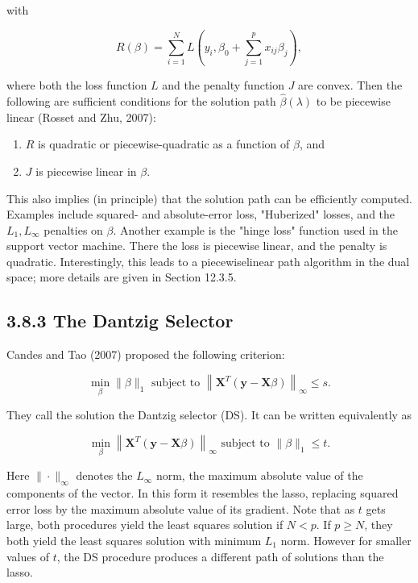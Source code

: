 \documentclass[10pt]{article}
\begin{document}
with


\begin{equation*}
R(\beta)=\sum_{i=1}^{N} L\left(y_{i}, \beta_{0}+\sum_{j=1}^{p} x_{i j} \beta_{j}\right), \tag{3.77}
\end{equation*}


where both the loss function $L$ and the penalty function $J$ are convex. Then the following are sufficient conditions for the solution path $\hat{\beta}(\lambda)$ to be piecewise linear (Rosset and Zhu, 2007):

\begin{enumerate}
  \item $R$ is quadratic or piecewise-quadratic as a function of $\beta$, and
  \item $J$ is piecewise linear in $\beta$.
\end{enumerate}

This also implies (in principle) that the solution path can be efficiently computed. Examples include squared- and absolute-error loss, "Huberized" losses, and the $L_{1}, L_{\infty}$ penalties on $\beta$. Another example is the "hinge loss" function used in the support vector machine. There the loss is piecewise linear, and the penalty is quadratic. Interestingly, this leads to a piecewiselinear path algorithm in the dual space; more details are given in Section 12.3.5.

\subsection*{3.8.3 The Dantzig Selector}
Candes and Tao (2007) proposed the following criterion:


\begin{equation*}
\min _{\beta}\|\beta\|_{1} \text { subject to }\left\|\mathbf{X}^{T}(\mathbf{y}-\mathbf{X} \beta)\right\|_{\infty} \leq s . \tag{3.78}
\end{equation*}


They call the solution the Dantzig selector (DS). It can be written equivalently as


\begin{equation*}
\min _{\beta}\left\|\mathbf{X}^{T}(\mathbf{y}-\mathbf{X} \beta)\right\|_{\infty} \text { subject to }\|\beta\|_{1} \leq t . \tag{3.79}
\end{equation*}


Here $\|\cdot\|_{\infty}$ denotes the $L_{\infty}$ norm, the maximum absolute value of the components of the vector. In this form it resembles the lasso, replacing squared error loss by the maximum absolute value of its gradient. Note that as $t$ gets large, both procedures yield the least squares solution if $N<p$. If $p \geq N$, they both yield the least squares solution with minimum $L_{1}$ norm. However for smaller values of $t$, the DS procedure produces a different path of solutions than the lasso.
\end{document}
